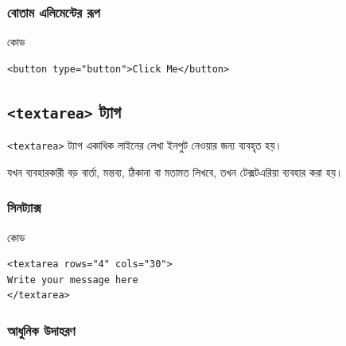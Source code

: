 \subsubsection{বোতাম এলিমেন্টের রূপ}

\begin{examplebox}{কোড}
\par\noindent\begin{minipage}{\linewidth}
\begin{verbatim}
<button type="button">Click Me</button>
\end{verbatim}
\end{minipage}\par
\end{examplebox}

\subsection{\texttt{<textarea>} ট্যাগ}

\begin{definitionbox}{}
\texttt{<textarea>} ট্যাগ একাধিক লাইনের লেখা ইনপুট নেওয়ার জন্য ব্যবহৃত হয়।
\end{definitionbox}

যখন ব্যবহারকারী বড় বার্তা, মন্তব্য, ঠিকানা বা মতামত লিখবে, তখন টেক্সটএরিয়া ব্যবহার করা হয়।

\subsubsection{সিনট্যাক্স}

\begin{examplebox}{কোড}
\par\noindent\begin{minipage}{\linewidth}
\begin{verbatim}
<textarea rows="4" cols="30">
Write your message here
</textarea>
\end{verbatim}
\end{minipage}\par
\end{examplebox}

\subsubsection{আধুনিক উদাহরণ}


